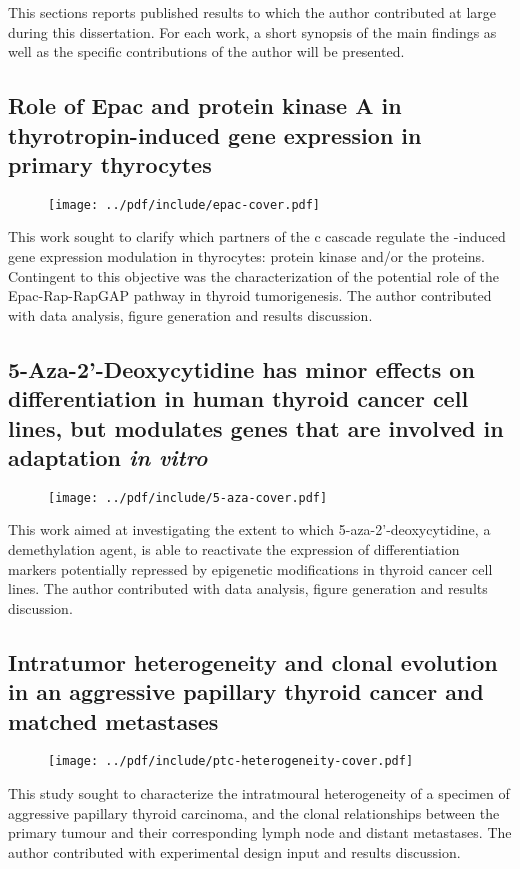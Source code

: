 This sections reports published results to which the author contributed at large
during this dissertation.  For each work, a short synopsis of the main findings
as well as the specific contributions of the author will be presented.

\subsection{Role of Epac and protein kinase A in thyrotropin-induced gene
  expression in primary thyrocytes}
\begin{figure}[h]
  \texttt{[image: ../pdf/include/epac-cover.pdf]}
\end{figure}

This work sought to clarify which partners of the c cascade
regulate the -induced gene expression modulation in thyrocytes:
protein kinase  and/or the  proteins.  Contingent
to this objective was the characterization of the potential role of the
Epac-Rap-RapGAP pathway in thyroid tumorigenesis.  The author contributed with
data analysis, figure generation and results discussion.

\clearpage

\subsection{5-Aza-2'-Deoxycytidine has minor effects on differentiation in human
  thyroid cancer cell lines, but modulates genes that are involved in adaptation
  \emph{in vitro}}
\begin{figure}[h]
  \texttt{[image: ../pdf/include/5-aza-cover.pdf]}
\end{figure}

This work aimed at investigating the extent to which 5-aza-2'-deoxycytidine, a
 demethylation agent, is able to reactivate the expression of
differentiation markers potentially repressed by epigenetic
modifications in thyroid cancer cell lines.  The author contributed with data
analysis, figure generation and results discussion.

\clearpage

\subsection{Intratumor heterogeneity and clonal evolution in an aggressive
  papillary thyroid cancer and matched metastases}
\begin{figure}[h]
  \texttt{[image: ../pdf/include/ptc-heterogeneity-cover.pdf]}
\end{figure}

This study sought to characterize the intratmoural heterogeneity of a specimen
of aggressive papillary thyroid carcinoma, and the clonal relationships between
the primary tumour and their corresponding lymph node and distant metastases.
The author contributed with experimental design input and results discussion.

